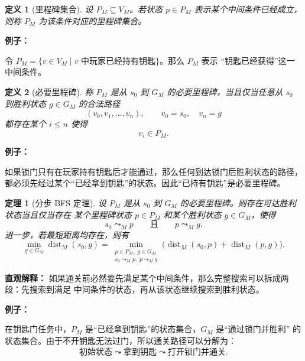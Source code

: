 \documentclass[UTF8]{ctexart}
\theoremstyle{nesylinkblock}
\newtheorem{definition}{定义}
\newtheorem{theorem}{定理}
\DeclareMathOperator{\dist}{dist}
\newenvironment{examplebox}
  {\begin{center}\begin{lrbox}{\exampleboxcontent}\begin{minipage}{0.92\linewidth}
   \textbf{例子：}\par\smallskip}
  {\end{minipage}\end{lrbox}\fbox{\usebox{\exampleboxcontent}}\end{center}}
\begin{document}
\begin{definition}[里程碑集合]
设 $P_M\subseteq V_M$。若状态 $p\in P_M$ 表示某个中间条件已经成立，则称
$P_M$ 为该条件对应的里程碑集合。
\end{definition}

\begin{examplebox}
令 $P_M=\{v\in V_M\mid v\text{ 中玩家已经持有钥匙}\}$。那么 $P_M$ 表示
“钥匙已经获得”这一中间条件。
\end{examplebox}

\begin{definition}[必要里程碑]
称 $P_M$ 是从 $s_0$ 到 $G_M$ 的必要里程碑，当且仅当任意从 $s_0$ 到胜利状态
$g\in G_M$ 的合法路径
\[
  (v_0,v_1,\ldots,v_n),\qquad v_0=s_0,\quad v_n=g
\]
都存在某个 $i\le n$ 使得
\[
  v_i\in P_M.
\]
\end{definition}

\begin{examplebox}
如果锁门只有在玩家持有钥匙后才能通过，那么任何到达锁门后胜利状态的路径，
都必须先经过某个“已经拿到钥匙”的状态。因此“已持有钥匙”是必要里程碑。
\end{examplebox}

\begin{theorem}[分步 BFS 定理]
设 $P_M$ 是从 $s_0$ 到 $G_M$ 的必要里程碑。则存在可达胜利状态当且仅当存在
某个里程碑状态 $p\in P_M$ 和某个胜利状态 $g\in G_M$，使得
\[
  s_0\leadsto_M p
  \qquad\text{且}\qquad
  p\leadsto_M g.
\]
进一步，若最短距离均存在，则有
\[
  \min_{g\in G_M}\dist_M(s_0,g)
  =
  \min_{\substack{p\in P_M,\; g\in G_M\\
                  s_0\leadsto_M p,\; p\leadsto_M g}}
  \bigl(\dist_M(s_0,p)+\dist_M(p,g)\bigr).
\]
\end{theorem}

\noindent\textbf{直观解释：}
如果通关前必然要先满足某个中间条件，那么完整搜索可以拆成两段：先搜索到满足
中间条件的状态，再从该状态继续搜索到胜利状态。

\begin{examplebox}
在钥匙门任务中，$P_M$ 是“已经拿到钥匙”的状态集合，$G_M$ 是“通过锁门并胜利”
的状态集合。由于不开钥匙无法过门，所以通关路径可以分解为：
\[
  \text{初始状态}\leadsto\text{拿到钥匙}
  \leadsto\text{打开锁门并通关}.
\]
\end{examplebox}
\end{document}
